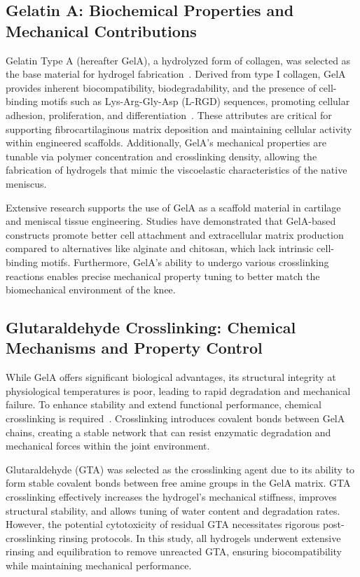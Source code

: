 \subsection{Gelatin A: Biochemical Properties and Mechanical Contributions}

Gelatin Type A (hereafter GelA), a hydrolyzed form of collagen, was selected as the base material for hydrogel fabrication~\cite{ahmed2015hydrogelpreparation}. Derived from type I collagen, GelA provides inherent biocompatibility, biodegradability, and the presence of cell-binding motifs such as Lys-Arg-Gly-Asp (L-RGD) sequences, promoting cellular adhesion, proliferation, and differentiation~\cite{2021synthesisapplication,ahmed2015hydrogelpreparation,choi20213dprintedgelatin,zhang2005electrospinninggelatin}. These attributes are critical for supporting fibrocartilaginous matrix deposition and maintaining cellular activity within engineered scaffolds. Additionally, GelA's mechanical properties are tunable via polymer concentration and crosslinking density, allowing the fabrication of hydrogels that mimic the viscoelastic characteristics of the native meniscus.

Extensive research supports the use of GelA as a scaffold material in cartilage and meniscal tissue engineering. Studies have demonstrated that GelA-based constructs promote better cell attachment and extracellular matrix production compared to alternatives like alginate and chitosan, which lack intrinsic cell-binding motifs. Furthermore, GelA's ability to undergo various crosslinking reactions enables precise mechanical property tuning to better match the biomechanical environment of the knee.

\subsection{Glutaraldehyde Crosslinking: Chemical Mechanisms and Property Control}

While GelA offers significant biological advantages, its structural integrity at physiological temperatures is poor, leading to rapid degradation and mechanical failure. To enhance stability and extend functional performance, chemical crosslinking is required~\cite{ahmed2015hydrogelpreparation,gao2018electrospunfiber,chaudhuri2016hydrogelstunable}. Crosslinking introduces covalent bonds between GelA chains, creating a stable network that can resist enzymatic degradation and mechanical forces within the joint environment.

Glutaraldehyde (GTA) was selected as the crosslinking agent due to its ability to form stable covalent bonds between free amine groups in the GelA matrix. GTA crosslinking effectively increases the hydrogel's mechanical stiffness, improves structural stability, and allows tuning of water content and degradation rates. However, the potential cytotoxicity of residual GTA necessitates rigorous post-crosslinking rinsing protocols. In this study, all hydrogels underwent extensive rinsing and equilibration to remove unreacted GTA, ensuring biocompatibility while maintaining mechanical performance.


